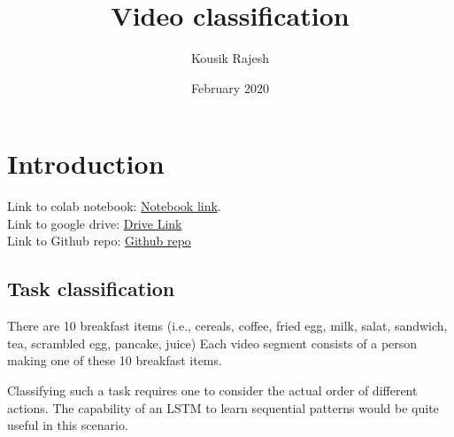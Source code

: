 \documentclass{article}
\title{Video classification}
\author{Kousik Rajesh }
\date{February 2020}
\begin{document}
\maketitle

\section*{Introduction}
Link to colab notebook: \textcolor{blue}{\href{https://colab.research.google.com/drive/1ThWqv2jwK57T9Aenhff0U7XSn46bT1qS}{Notebook link}.}\\
Link to google drive: \textcolor{blue}{\href{https://drive.google.com/drive/folders/1ZnX1hGODNWyqyYUgabagEK3TogYiJN10?usp=sharing}{Drive Link}}\\
Link to Github repo: \textcolor{blue}{\href{https://drive.google.com/drive/folders/1ZnX1hGODNWyqyYUgabagEK3TogYiJN10?usp=sharing}{Github repo}}
\subsection*{Task classification}

There are 10 breakfast items (i.e., cereals, coffee, fried egg, milk, salat, sandwich, tea, scrambled egg, pancake, juice)
Each video segment consists of a person making one of these 10 breakfast items.

Classifying such a task requires one to consider the actual order of different actions. The capability of an LSTM to learn sequential patterns would be quite useful in this scenario.
\end{document}
